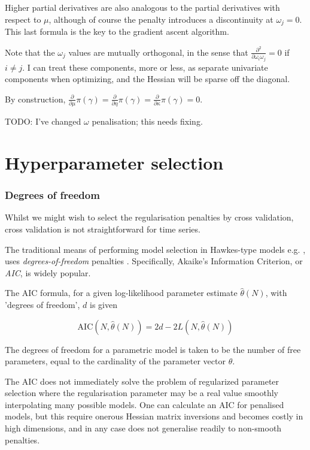 \documentclass[11pt]{article}
\begin{document}
Higher partial derivatives are also analogous to the partial derivatives
with respect to \(\mu\), although of course the penalty introduces a
discontinuity at \(\omega_j=0\). This last formula is the key to the
gradient ascent algorithm.

Note that the \(\omega_j\) values are mutually orthogonal, in the sense
that \({ \scriptstyle \frac{\partial^2}{\partial\omega_i\omega_j}} =0\)
if \(i\ne j\). I can treat these components, more or less, as separate
univariate components when optimizing, and the Hessian will be sparse
off the diagonal.

By construction,
\({ \scriptstyle \frac{\partial}{\partial\mu} }\pi(\gamma) = { \scriptstyle \frac{\partial}{\partial\eta} }\pi(\gamma) = { \scriptstyle \frac{\partial}{\partial\kappa} }\pi(\gamma) = 0\).

TODO: I've changed \(\omega\) penalisation; this needs fixing.

    \section{Hyperparameter selection}\label{hyperparameter-selection}

    \subsubsection{Degrees of freedom}\label{degrees-of-freedom}

Whilst we might wish to select the regularisation penalties by cross
validation, cross validation is not straightforward for time series.

The traditional means of performing model selection in Hawkes-type
models e.g. \cite{ogata_estimation_1983}, uses \emph{degrees-of-freedom}
penalties \cite{efron_how_1986}. Specifically, Akaike's
\cite{akaike_likelihood_1981} Information Criterion, or \emph{AIC}, is
widely popular.

The AIC formula, for a given log-likelihood parameter estimate
\(\hat{\theta}(N)\), with 'degrees of freedom', \(d\) is given

\[\mathrm{AIC}(N,\hat{\theta}(N))=2d-2L(N,\hat{\theta}(N))\]

The degrees of freedom for a parametric model is taken to be the number
of free parameters, equal to the cardinality of the parameter vector
\(\theta\).

    The AIC does not immediately solve the problem of regularized parameter
selection where the regularisation parameter may be a real value
smoothly interpolating many possible models. One can calculate an AIC
for penalised models, but this require onerous Hessian matrix inversions
and becomes costly in high dimensions, and in any case does not
generalise readily to non-smooth penalties.
\cite{konishi_information_2008}
\end{document}
